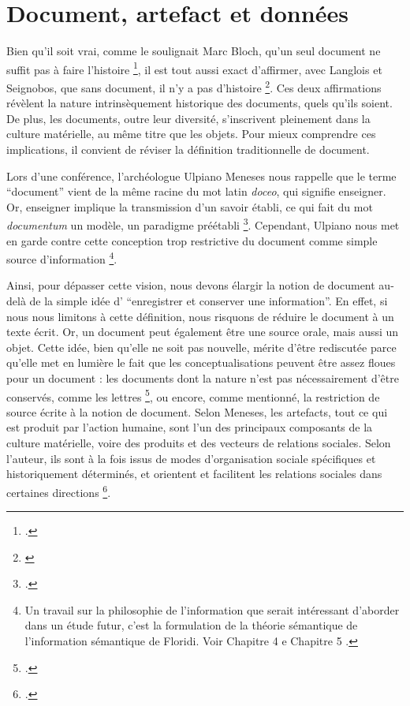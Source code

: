         \section{Document, artefact et données}
        
        Bien qu'il soit vrai, comme le soulignait Marc Bloch, qu'un seul document ne suffit pas à faire l'histoire \footnote{\cite[p.~37-42]{bloch1952}.}, il est tout aussi exact d'affirmer, avec Langlois et Seignobos, que sans document, il n'y a pas d'histoire \footnote{\cite[p.~13]{langlois_seignobos1992}}. Ces deux affirmations révèlent la nature intrinsèquement historique des documents, quels qu'ils soient. De plus, les documents, outre leur diversité, s'inscrivent pleinement dans la culture matérielle, au même titre que les objets. Pour mieux comprendre ces implications, il convient de réviser la définition traditionnelle de document.

        Lors d'une conférence, l'archéologue Ulpiano Meneses nous rappelle que le terme \enquote{document} vient de la même racine du mot latin \textit{doceo}, qui signifie enseigner. Or, enseigner implique la transmission d'un savoir établi, ce qui fait du mot \textit{documentum} un modèle, un paradigme préétabli \footnote{\cite[p.~1-3]{meneses1980}.}. Cependant, Ulpiano nous met en garde contre cette conception trop restrictive du document comme simple source d'information \footnote{Un travail sur la philosophie de l'information que serait intéressant d'aborder dans un étude futur, c'est la formulation de la théorie sémantique de l'information sémantique de Floridi. Voir Chapitre 4 e Chapitre 5 \cite{floridi_2011}.}.

        Ainsi, pour dépasser cette vision, nous devons élargir la notion de document au-delà de la simple idée d' \enquote{enregistrer et conserver une information}. En effet, si nous nous limitons à cette définition, nous risquons de réduire le document à un texte écrit. Or, un document peut également être une source orale, mais aussi un objet. Cette idée, bien qu'elle ne soit pas nouvelle, mérite d'être rediscutée parce qu'elle met en lumière le fait que les conceptualisations peuvent être assez floues pour un document : les documents dont la nature n'est pas nécessairement d'être conservés, comme les lettres \footnote{\cite[p.~2]{meneses1980}.}, ou encore, comme mentionné, la restriction de source écrite à la notion de document. Selon Meneses, les artefacts, tout ce qui est produit par l'action humaine, sont l'un des principaux composants de la culture matérielle, voire des produits et des vecteurs de relations sociales. Selon l'auteur, ils sont à la fois issus de modes d'organisation sociale spécifiques et historiquement déterminés, et orientent et facilitent les relations sociales dans certaines directions \footnote{\cite[p.~112-113]{meneses1983}.}.
     
